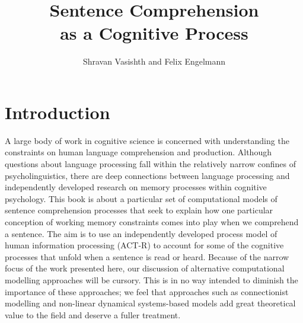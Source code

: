 \documentclass{cambridge7A}\usepackage[]{graphicx}\usepackage[]{color}
\begin{document}
  \title[A Computational Approach]
    {Sentence Comprehension \\ as a Cognitive Process}
  \author{Shravan Vasishth and Felix Engelmann}
 

\frontmatter
\maketitle
\tableofcontents
\listoffigures
\listoftables

 





\mainmatter


\chapter{Introduction} \label{c00}

A large body of work in cognitive science is concerned with
understanding the constraints on human language comprehension and production. Although questions about language processing fall within the relatively narrow confines of psycholinguistics, there are deep connections between language processing and independently developed research on memory processes within cognitive psychology. This book is about a particular set of computational models of sentence
comprehension processes \citep{LewisVasishth2005,EngelmannJaegerVasishth2019} that seek to explain how one particular conception of working memory constraints
comes into play when we comprehend a sentence. The aim is to use an independently developed process model of human information processing  
(ACT-R) to account for some of the cognitive processes that unfold when a sentence is read or heard. Because of the narrow focus of the work presented here, our discussion of alternative computational modelling approaches will be cursory. This is in no way intended to diminish the importance of these approaches; we feel that approaches such as connectionist modelling and non-linear dynamical systems-based models add great theoretical value to the field and deserve a fuller treatment.
\end{document}
